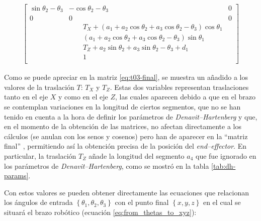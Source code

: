 \begin{align}
{\begin{bmatrix}
        \sin{\theta_{2} - \theta_{3}}                  & - \cos{\theta_{2} - \theta_{3}}                                                                                   & 0                  \\
        0                                              & 0                                                                                                                 & 0                  \\
                                                       & \qquad T_{X} + \left(a_{1} + a_2 \cos{\theta_{2}} + a_{3} \cos{\theta_{2} - \theta_{3}}\right) \cos{\theta_{1}}                      \\
                                                       & \qquad \left(a_1 + a_{2} \cos{\theta_{2}} + a_{3} \cos{\theta_{2} - \theta_{3}}\right) \sin{\theta_{1}}                              \\
                                                       & \qquad T_{Z} + a_{2} \sin{\theta_{2}} + a_{3} \sin{\theta_{2} - \theta_{3}} + d_1                                                   \\
                                                       & \qquad 1                                                                                                                               \\
    \end{bmatrix}}\label{eq:t03-final}
\end{align}

Como se puede apreciar en la matriz \ref{eq:t03-final}, se muestra un añadido a los valores
de la traslación $T$: $T_X$ y $T_Z$. Estas dos variables representan traslaciones tanto 
en el eje $X$ y como en el eje $Z$, las cuales aparecen debido a que en el brazo 
se contemplan variaciones en la longitud de ciertos segmentos, que no se han tenido en 
cuenta a la hora de definir los parámetros de \textit{Denavit--Hartenberg} y que, 
en el momento de la obtención de las matrices, no afectan directamente a los cálculos 
(se anulan con los senos y cosenos) pero han de aparecer en la ``matriz final'' ,
permitiendo así la obtención precisa de la posición del \textit{end--effector}. En particular, 
la traslación $T_Z$ añade la longitud del segmento $a_4$ que fue ignorado en los 
parámetros de \textit{Denavit--Hartenberg}, como se mostró en la tabla \ref{tab:dh-params}.

Con estos valores se pueden obtener directamente las ecuaciones que relacionan
los ángulos de entrada $\left\{\theta_1, \theta_2, \theta_3\right\}$ con el punto
final $\left\{x, y, z\right\}$ en el cual se situará el brazo robótico (ecuación
\ref{eq:from_thetas_to_xyz}):


